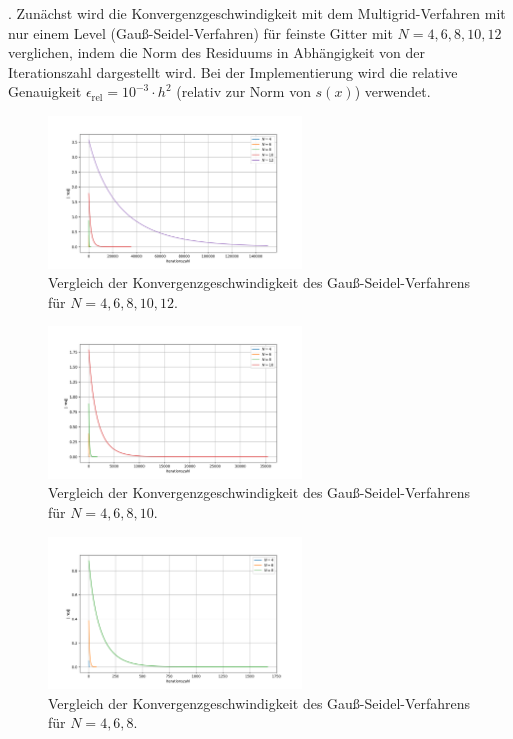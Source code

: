 \documentclass[11pt,a4paper]{article}
\begin{document}
. Zunächst wird die Konvergenzgeschwindigkeit mit dem Multigrid-Verfahren mit nur einem Level (Gauß-Seidel-Verfahren) für feinste Gitter mit $N = 4,6,8,10,12$ verglichen, indem die Norm des Residuums in Abhängigkeit von der
Iterationszahl dargestellt wird. Bei der Implementierung wird die relative Genauigkeit $\epsilon_{\mathrm{rel}} = 10^{-3} \cdot h^2$ (relativ zur Norm von $s(x)$) verwendet.
\begin{figure}[htbp]
    \centering
    \includegraphics[width=0.6\textwidth,scale=0.7]{h2_N_comparison_1}
    \caption[Vergleich der Konvergenzgeschwindigkeit des Gauß-Seidel-Verfahrens für $N = 4,6,8,10,12$.]{Vergleich der Konvergenzgeschwindigkeit des Gauß-Seidel-Verfahrens für $N = 4,6,8,10,12$.}\label{fig:h2_N_comparison_1}
\end{figure}
\begin{figure}[htbp]
    \centering
    \includegraphics[width=0.6\textwidth,scale=0.7]{h2_N_comparison_2}
    \caption[Vergleich der Konvergenzgeschwindigkeit des Gauß-Seidel-Verfahrens für $N = 4,6,8,10$.]{Vergleich der Konvergenzgeschwindigkeit des Gauß-Seidel-Verfahrens für $N = 4,6,8,10$.}\label{fig:h2_N_comparison_2}
\end{figure}
\begin{figure}[htbp]
    \centering
    \includegraphics[width=0.6\textwidth,scale=0.7]{h2_N_comparison_3}
    \caption[Vergleich der Konvergenzgeschwindigkeit des Gauß-Seidel-Verfahrens für $N = 4,6,8$.]{Vergleich der Konvergenzgeschwindigkeit des Gauß-Seidel-Verfahrens für $N = 4,6,8$.}\label{fig:h2_N_comparison_3}
\end{figure}\newpage
\end{document}
